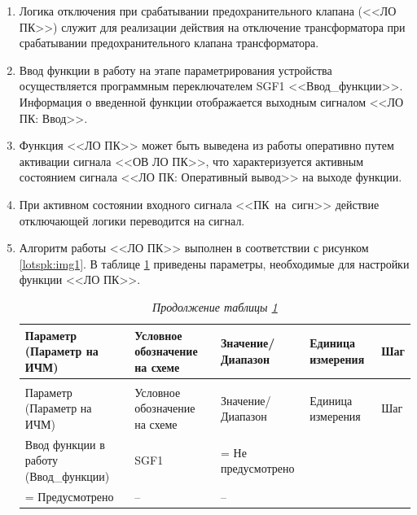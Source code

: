\documentclass[a4paper, 12pt,table, hidelinks, DIV=calc]{extarticle} %
\begin{document}
\begin{enumerate}[label=\arabic{section}.\arabic{subsection}.\arabic{enumi}, labelsep=4pt, leftmargin=0pt, itemindent=57pt, itemsep=0pt, parsep=5pt]
\begin{enumerate}[label=\arabic{section}.\arabic{subsection}.\arabic{enumi}.\arabic*, labelsep=4pt, leftmargin=0em, itemindent=65pt, parsep=0pt]
\item
Логика отключения при срабатывании предохранительного клапана (<<ЛО ПК>>) служит для реализации действия на отключение трансформатора при срабатывании предохранительного клапана трансформатора.
\item
Ввод функции в работу на этапе параметрирования устройства осуществляется программным переключателем SGF1 <<Ввод\_функции>>. Информация о введенной функции отображается выходным сигналом <<ЛО ПК: Ввод>>.
\item
Функция <<ЛО ПК>> может быть выведена из работы оперативно путем активации сигнала <<ОВ ЛО ПК>>, что характеризуется активным состоянием сигнала <<ЛО ПК: Оперативный вывод>> на выходе функции.
\item
При активном состоянии входного сигнала <<ПК~на~сигн>> действие отключающей логики переводится на сигнал.
\item
Алгоритм работы <<ЛО ПК>> выполнен в соответствии с рисунком \ref{lotspk:img1}. В таблице \ref{lotspk:tbl1} приведены параметры, необходимые для настройки функции <<ЛО ПК>>.

\small
\begin{longtable}{|>{\centering\arraybackslash}m{5.3cm}|>{\centering\arraybackslash}m{3.3cm}|>{\centering\arraybackslash}m{4.2cm}|>{\centering\arraybackslash}m{1.8cm}|>{\centering\arraybackslash}m{1cm}|}
\caption{Параметры для настройки функции <<ЛО ПК>>\hfill\vspace{-0.5\baselineskip}}\label{lotspk:tbl1}\\ 
\hline
\rowcolor{gray!30}
Параметр (Параметр на ИЧМ) & Условное обозначение на схеме & Значение/ Диапазон & Единица измерения & Шаг \\ 
\hline
\endfirsthead
\caption*{\hspace{3pt}\emph{Продолжение таблицы \ref{lotspk:tbl1}\hfill\vspace{-0.5\baselineskip}}} \\ %
\hline
\rowcolor{gray!30}
Параметр (Параметр на ИЧМ) & Условное обозначение на схеме & Значение/ Диапазон & Единица измерения & Шаг \\ 
\endhead
\endfoot
\endlastfoot
\centering Ввод функции в работу (Ввод\_функции) & \centering SGF1 & \centering 0 = Не предусмотрено\\1 = Предусмотрено & \centering -- & \centering \arraybackslash -- \\
\hline
\end{longtable}
\normalsize


\end{enumerate}
\end{enumerate}
\end{document}
